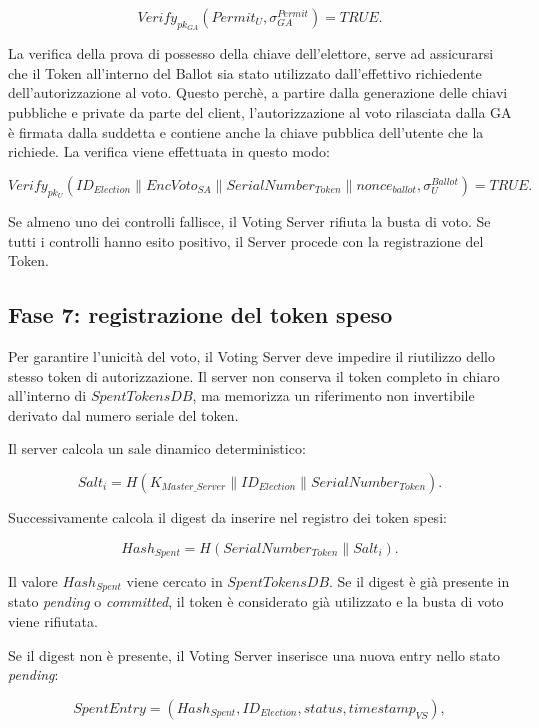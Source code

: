\documentclass[a4paper,12pt]{article}
\begin{document}
\[
	Verify_{pk_{GA}}(Permit_U, \sigma_{GA}^{Permit}) = TRUE.
\]

La verifica della prova di possesso della chiave dell'elettore, serve ad assicurarsi che il Token all'interno
del Ballot sia stato utilizzato dall'effettivo richiedente dell'autorizzazione al voto. Questo perchè, a partire dalla generazione
delle chiavi pubbliche e private da parte del client, l'autorizzazione al voto rilasciata dalla GA è firmata dalla suddetta e contiene
anche la chiave pubblica dell'utente che la richiede. La verifica viene effettuata in questo modo:

\[
	Verify_{pk_U}(ID_{Election} \parallel EncVoto_{SA} \parallel SerialNumber_{Token} \parallel nonce_{ballot}, \sigma_U^{Ballot}) = TRUE.
\]



Se almeno uno dei controlli fallisce, il Voting Server rifiuta la busta di voto. 
Se tutti i controlli hanno esito positivo, il Server procede con la registrazione del Token. 

\subsection{Fase 7: registrazione del token speso}

Per garantire l'unicit\`a del voto, il Voting Server deve impedire il riutilizzo dello stesso token di autorizzazione. 
Il server non conserva il token completo in chiaro all'interno di \(SpentTokensDB\), ma memorizza un riferimento non invertibile derivato dal numero seriale del token.

Il server calcola un sale dinamico deterministico:

\[
	Salt_i =
	H(K_{Master\_Server} \parallel ID_{Election} \parallel SerialNumber_{Token}).
\]

Successivamente calcola il digest da inserire nel registro dei token spesi:

\[
	Hash_{Spent} =
	H(SerialNumber_{Token} \parallel Salt_i).
\]

Il valore \(Hash_{Spent}\) viene cercato in \(SpentTokensDB\). 
Se il digest \`e gi\`a presente in stato \emph{pending} o \emph{committed}, il token \`e considerato gi\`a utilizzato e la busta di voto viene rifiutata.

Se il digest non \`e presente, il Voting Server inserisce una nuova entry nello stato \emph{pending}:

\[
	SpentEntry =
	(Hash_{Spent}, ID_{Election}, status, timestamp_{VS}),
\]
\end{document}
